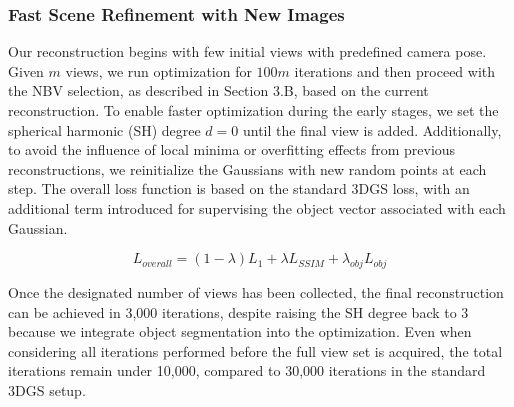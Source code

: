 \subsubsection{Fast Scene Refinement with New Images}
Our reconstruction begins with few initial views with predefined camera pose. Given $m$ views, we run optimization for $100m$ iterations and then proceed with the \ac{NBV} selection, as described in Section 3.B, based on the current reconstruction. To enable faster optimization during the early stages, we set the spherical harmonic (SH) degree $d=0$ until the final view is added. Additionally, to avoid the influence of local minima or overfitting effects from previous reconstructions, we reinitialize the Gaussians with new random points at each step. The overall loss function is based on the standard 3DGS loss, with an additional term introduced for supervising the object vector associated with each Gaussian.


{\small
\begin{equation}
L_{overall} = (1-\lambda) L_{1} + \lambda L_{SSIM} + \lambda_{obj}L_{obj}
\end{equation}
}


Once the designated number of views has been collected, the final reconstruction can be achieved in 3,000 iterations, despite raising the SH degree back to 3 because we integrate object segmentation into the optimization. Even when considering all iterations performed before the full view set is acquired, the total iterations remain under 10,000, compared to 30,000 iterations in the standard \ac{3DGS} setup.

